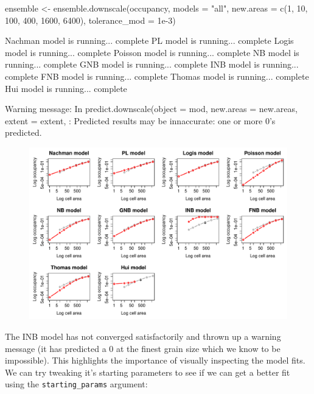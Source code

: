 \documentclass{article}[12pt, a4paper]
\begin{document}
\begin{Schunk}
\begin{Sinput}
ensemble <- ensemble.downscale(occupancy,
                               models = "all",
                               new.areas = c(1, 10, 100, 400, 1600, 6400),
                               tolerance_mod = 1e-3)
\end{Sinput}
\begin{Soutput}
Nachman model is running...  complete 
PL model is running...  complete 
Logis model is running...  complete 
Poisson model is running...  complete 
NB model is running...  complete 
GNB model is running...  complete 
INB model is running...  complete 
FNB model is running...  complete 
Thomas model is running...  complete 
Hui model is running...  complete

Warning message:
In predict.downscale(object = mod, new.areas = new.areas, extent = extent,  :
  Predicted results may be innaccurate: one or more 0's predicted.
\end{Soutput}
\end{Schunk}

\begin{figure}[!ht]
\centering
\includegraphics[width=\linewidth]{Downscaling-downscale34}
\end{figure}

\newpage
The INB model has not converged satisfactorily and thrown up a warning message (it has predicted a 0 at the finest grain size which we know to be impossible). This highlights the importance of visually inspecting the model fits. We can try tweaking it’s starting parameters to see if we can get a better fit using the \texttt{starting\_params} argument:
\end{document}
